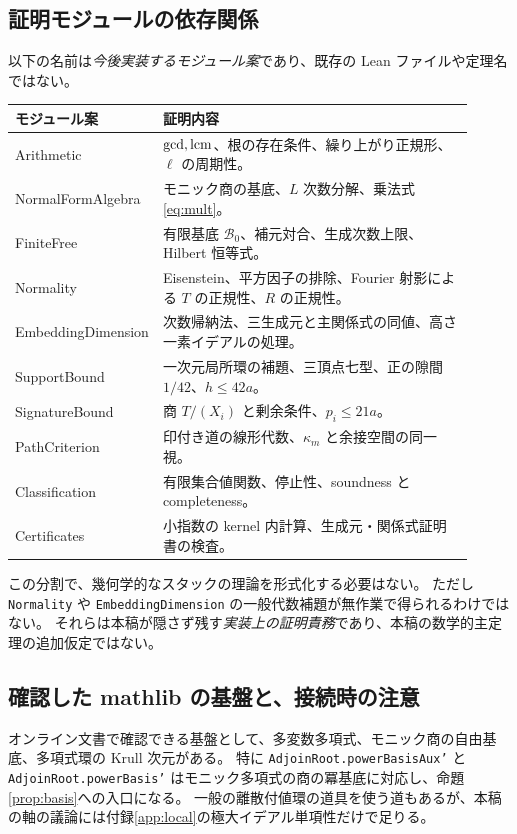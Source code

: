 \documentclass[11pt,a4paper]{ltjsarticle}
\numberwithin{equation}{section}
\theoremstyle{definition}
\begin{document}
\subsection{証明モジュールの依存関係}
以下の名前は\emph{今後実装するモジュール案}であり、既存の Lean ファイルや定理名ではない。
\begin{center}\small
\begin{tabular}{p{0.21\linewidth}p{0.70\linewidth}}
\toprule
モジュール案 & 証明内容\\\midrule
Arithmetic & $\gcd,\operatorname{lcm}$、根の存在条件、繰り上がり正規形、$\ell$ の周期性。\\
NormalFormAlgebra & モニック商の基底、$L$ 次数分解、乗法式 \eqref{eq:mult}。\\
FiniteFree & 有限基底 $\mathcal B_0$、補元対合、生成次数上限、Hilbert 恒等式。\\
Normality & Eisenstein、平方因子の排除、Fourier 射影による $T$ の正規性、$R$ の正規性。\\
EmbeddingDimension & 次数帰納法、三生成元と主関係式の同値、高さ一素イデアルの処理。\\
SupportBound & 一次元局所環の補題、三頂点七型、正の隙間 $1/42$、$h\le42a$。\\
SignatureBound & 商 $T/(X_i)$ と剰余条件、$p_i\le21a$。\\
PathCriterion & 印付き道の線形代数、$\kappa_m$ と余接空間の同一視。\\
Classification & 有限集合値関数、停止性、soundness と completeness。\\
Certificates & 小指数の kernel 内計算、生成元・関係式証明書の検査。\\\bottomrule
\end{tabular}
\end{center}
この分割で、幾何学的なスタックの理論を形式化する必要はない。
ただし \texttt{Normality} や \texttt{EmbeddingDimension} の一般代数補題が無作業で得られるわけではない。
それらは本稿が隠さず残す\emph{実装上の証明責務}であり、本稿の数学的主定理の追加仮定ではない。

\subsection{確認した mathlib の基盤と、接続時の注意}
オンライン文書で確認できる基盤として、多変数多項式\cite{mathlib-mv}、モニック商の自由基底\cite{mathlib-adjoin}、多項式環の Krull 次元\cite{mathlib-dim}がある。
特に \texttt{AdjoinRoot.powerBasisAux'} と \texttt{AdjoinRoot.powerBasis'} はモニック多項式の商の冪基底に対応し、命題\ref{prop:basis}への入口になる。
一般の離散付値環の道具\cite{mathlib-dvr}を使う道もあるが、本稿の軸の議論には付録\ref{app:local}の極大イデアル単項性だけで足りる。
\end{document}
